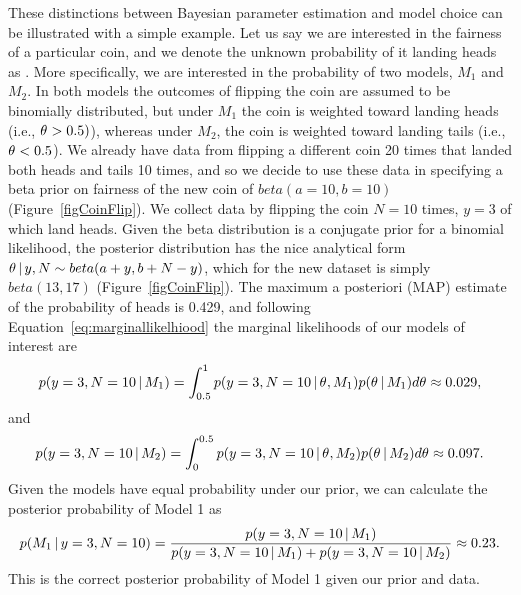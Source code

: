 \documentclass[letterpaper,12pt]{article}
\begin{document}
\begin{linenumbers}
These distinctions between Bayesian parameter estimation and model choice can
be illustrated with a simple example.
Let us say we are interested in the fairness of a particular coin, and we
denote the unknown probability of it landing heads as \myTheta{}.
More specifically, we are interested in the probability of two models, $M_1$
and $M_2$.
In both models the outcomes of flipping the coin are assumed to be binomially
distributed, but under $M_1$ the coin is weighted toward landing heads (i.e.,
$\theta_{} > 0.5)$), whereas under $M_2$, the coin is weighted toward landing
tails (i.e., $\theta_{} < 0.5$).
We already have data from flipping a different coin 20 times that landed both
heads and tails 10 times, and so we decide to use these data in specifying a
beta prior on fairness of the new coin of $beta(a=10, b=10)$
(Figure~\ref{figCoinFlip}).
We collect data by flipping the coin $N=10$ times, $y=3$ of which land heads.
Given the beta distribution is a conjugate prior for a binomial likelihood, the
posterior distribution has the nice analytical form $\theta \,|\, y,N \sim
beta(a + y, b + N - y)$, which for the new dataset is simply $beta(13, 17)$
(Figure~\ref{figCoinFlip}).
The maximum a posteriori (MAP) estimate of the probability of heads is 0.429,
and following Equation~\ref{eq:marginallikelhiood} the marginal likelihoods of
our models of interest are
\begin{equation}
    p(y=3, N=10 \,|\, M_1) = \int_{0.5}^{1} p(y=3, N=10 \,|\,
    \theta_{}, M_1)p(\theta_{} \,|\, M_1) d\theta_{} \approx 0.029,
\end{equation}
and
\begin{equation}
    p(y=3, N=10 \,|\, M_2) = \int_{0}^{0.5} p(y=3, N=10 \,|\,
    \theta_{}, M_2)p(\theta_{} \,|\, M_2) d\theta_{} \approx 0.097.
\end{equation}
Given the models have equal probability under our prior, we can calculate the
posterior probability of Model 1 as
\begin{equation}
    p(M_1 \,|\, y=3, N=10) = \frac{p(y=3, N=10 \,|\, M_1)}{p(y=3, N=10 \,|\,
    M_1) + p(y=3, N=10 \,|\, M_2)} \approx 0.23.
\end{equation}
This is the correct posterior probability of Model 1 given our prior
and data.


\end{linenumbers}
\end{document}
